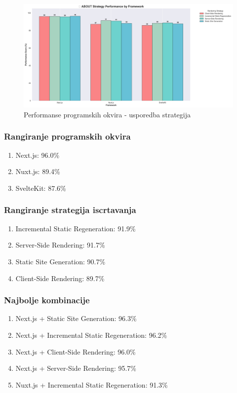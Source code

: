 \begin{figure}[H]
    \centering
    \includegraphics[width=\textwidth]{slike/rezultati/about/about_strategy_comparison.png}
    \caption{Performanse programskih okvira - usporedba strategija}
    \label{fig:testiranje-o-nama-usporedba-strategija}
\end{figure}

\subsubsection{Rangiranje programskih okvira}
\begin{enumerate}
    \item Next.js: 96.0\%
    \item Nuxt.js: 89.4\%
    \item SvelteKit: 87.6\%
\end{enumerate}

\subsubsection{Rangiranje strategija iscrtavanja}
\begin{enumerate}
    \item Incremental Static Regeneration: 91.9\%
    \item Server-Side Rendering: 91.7\%
    \item Static Site Generation: 90.7\%
    \item Client-Side Rendering: 89.7\%
\end{enumerate}

\subsubsection{Najbolje kombinacije}
\begin{enumerate}
    \item Next.js + Static Site Generation: 96.3\%
    \item Next.js + Incremental Static Regeneration: 96.2\%
    \item Next.js + Client-Side Rendering: 96.0\%
    \item Next.js + Server-Side Rendering: 95.7\%
    \item Nuxt.js + Incremental Static Regeneration: 91.3\%
\end{enumerate}

